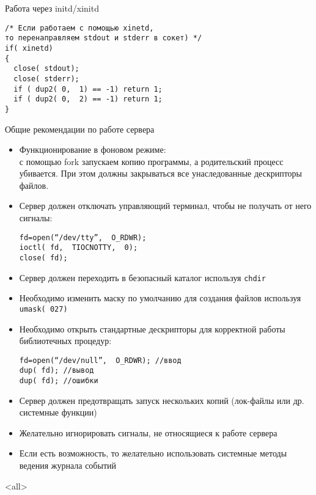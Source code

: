 \begin{frame}[fragile]{Работа через initd/xinitd}
	\scriptsize	
\begin{lstlisting}[Language=C]
/* Если работаем с помощью xinetd, 
то перенаправляем stdout и stderr в сокет) */
if( xinetd) 
{ 
  close( stdout); 
  close( stderr); 
  if ( dup2( 0,  1) == -1) return 1; 
  if ( dup2( 0,  2) == -1) return 1; 
} 
\end{lstlisting}
	\normalsize
\end{frame}

\begin{frame}[fragile]{Общие рекомендации по работе сервера}
	\scriptsize
	\begin{itemize}
		\item Функционирование в фоновом режиме:\\
			с помощью fork запускаем копию программы, а родительский процесс убивается. При этом должны закрываться все унаследованные дескрипторы файлов.
		\item Сервер должен отключать управляющий терминал,  чтобы не получать от него сигналы:\\
			\begin{verbatim}
fd=open(“/dev/tty”,  O_RDWR);
ioctl( fd,  TIOCNOTTY,  0);
close( fd);
			\end{verbatim}
		\item Сервер должен переходить в безопасный каталог используя {\tt chdir}
		\item Необходимо изменить маску по умолчанию для создания файлов используя {\tt umask( 027)}
		\item Необходимо открыть стандартные дескрипторы для корректной работы библиотечных процедур:\\
				\begin{verbatim}
fd=open(“/dev/null”,  O_RDWR); //ввод
dup( fd); //вывод
dup( fd); //ошибки
			\end{verbatim}
		\item Сервер должен предотвращать запуск нескольких копий (лок-файлы или др. системные функции)
		\item Желательно игнорировать сигналы,  не относящиеся к работе сервера
		\item Если есть возможность,  то желательно использовать системные методы ведения журнала событий
	\end{itemize}
\end{frame}

\mode<all>{}


